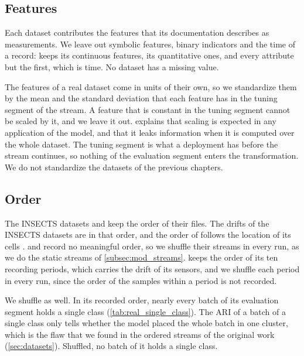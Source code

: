 \subsection{Features}
\label{subsec:real_features}

Each dataset contributes the features that its documentation describes as measurements. We leave out symbolic features, binary indicators and the time of a record: \KDDCup keeps its continuous features, \Covertype its quantitative ones, and \Shuttle every attribute but the first, which is time. No dataset has a missing value.

The features of a real dataset come in units of their own, so we standardize them by the mean and the standard deviation that each feature has in the tuning segment of the stream. A feature that is constant in the tuning segment cannot be scaled by it, and we leave it out.  explains that scaling is expected in any application of the model, and that it leaks information when it is computed over the whole dataset. The tuning segment is what a deployment has before the stream continues, so nothing of the evaluation segment enters the transformation. We do not standardize the datasets of the previous chapters.

\subsection{Order}
\label{subsec:real_order}

The INSECTS datasets and \Covertype keep the order of their files. The drifts of the INSECTS datasets are in that order, and the order of \Covertype follows the location of its cells \cite{souza2020challenges}. \Pendigits and \Shuttle record no meaningful order, so we shuffle their streams in every run, as we do the static streams of \cref{subsec:mod_streams}. \GasDrift keeps the order of its ten recording periods, which carries the drift of its sensors, and we shuffle each period in every run, since the order of the samples within a period is not recorded.



We shuffle \KDDCup as well. In its recorded order, nearly every batch of its evaluation segment holds a single class (\cref{tab:real_single_class}). The ARI of a batch of a single class only tells whether the model placed the whole batch in one cluster, which is the flaw that we found in the ordered streams of the original work (\cref{sec:datasets}). Shuffled, no batch of it holds a single class.

